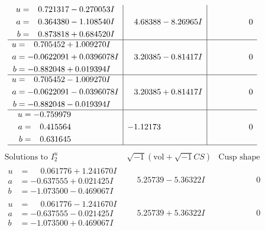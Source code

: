 \documentclass[1p]{elsarticle_modified}
\theoremstyle{definition}
\newcommand{\I}{\sqrt{-1}}
\begin{document}
$$\begin{array}{c|c|c}
\begin{aligned}
u &= \phantom{-}0.721317 - 0.270053 I \\
a &= \phantom{-}0.364380 - 1.108540 I \\
b &= \phantom{-}0.873818 + 0.684520 I\end{aligned}
 & \phantom{-}4.68388 - 8.26965 I & \phantom{-0.000000 } 0 \\ \hline\begin{aligned}
u &= \phantom{-}0.705452 + 1.009270 I \\
a &= -0.0622091 + 0.0396078 I \\
b &= -0.882048 + 0.019394 I\end{aligned}
 & \phantom{-}3.20385 - 0.81417 I & \phantom{-0.000000 } 0 \\ \hline\begin{aligned}
u &= \phantom{-}0.705452 - 1.009270 I \\
a &= -0.0622091 - 0.0396078 I \\
b &= -0.882048 - 0.019394 I\end{aligned}
 & \phantom{-}3.20385 + 0.81417 I & \phantom{-0.000000 } 0 \\ \hline\begin{aligned}
u &= -0.759979\phantom{ +0.000000I} \\
a &= \phantom{-}0.415564\phantom{ +0.000000I} \\
b &= \phantom{-}0.631645\phantom{ +0.000000I}\end{aligned}
 & -1.12173\phantom{ +0.000000I} & \phantom{-0.000000 } 0\\
 \hline 
 \end{array}$$\newpage$$\begin{array}{c|c|c}  
\text{Solutions to }I^u_{2}& \I (\text{vol} + \sqrt{-1}CS) & \text{Cusp shape}\\
 \hline 
\begin{aligned}
u &= \phantom{-}0.061776 + 1.241670 I \\
a &= -0.637555 + 0.021425 I \\
b &= -1.073500 - 0.469067 I\end{aligned}
 & \phantom{-}5.25739 - 5.36322 I & \phantom{-0.000000 } 0 \\ \hline\begin{aligned}
u &= \phantom{-}0.061776 - 1.241670 I \\
a &= -0.637555 - 0.021425 I \\
b &= -1.073500 + 0.469067 I\end{aligned}
 & \phantom{-}5.25739 + 5.36322 I & \phantom{-0.000000 } 0 \\ \hline\begin{aligned}

\end{aligned}
\end{array}$$
\end{document}

